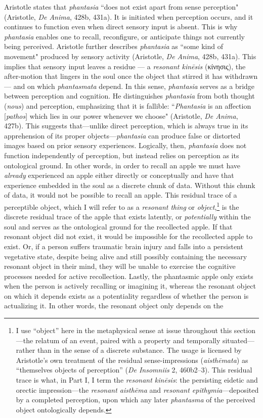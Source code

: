 \documentclass{article}
\newcommand{\gk}[1]{{\greekfont #1}}
\begin{document}
Aristotle states that \textit{phantasia} “does not exist apart from sense perception" (Aristotle, \textit{De Anima}, 428b, 431a). It is initiated when perception occurs, and it continues to function even when direct sensory input is absent. This is why \textit{phantasia} enables one to recall, reconfigure, or anticipate things not currently being perceived. Aristotle further describes \textit{phantasia} as “some kind of movement" produced by sensory activity (Aristotle, \textit{De Anima}, 428b, 431a). This implies that sensory input leaves a residue — a \textit{resonant kinēsis} (\gk{κίνησις}), the after-motion that lingers in the soul once the object that stirred it has withdrawn — and on which \textit{phantasmata} depend. In this sense, \textit{phantasia} serves as a bridge between perception and cognition. He distinguishes \textit{phantasia} from both thought (\textit{nous}) and perception, emphasizing that it is fallible: “\textit{Phantasia} is an affection [\textit{pathos}] which lies in our power whenever we choose" (Aristotle, \textit{De Anima}, 427b). This suggests that—unlike direct perception, which is always true in its apprehension of its proper objects—\textit{phantasia} can produce false or distorted images based on prior sensory experiences. Logically, then, \textit{phantasia} does not function independently of perception, but instead relies on perception as its ontological ground. In other words, in order to recall an apple we must have \textit{already} experienced an apple either directly or conceptually and have that experience embedded in the soul as a discrete chunk of data. Without this chunk of data, it would not be possible to recall an apple. This residual trace of a perceptible object, which I will refer to as a \textit{resonant thing} or \textit{object},\footnote{I use “object” here in the metaphysical sense at issue throughout this section—the relatum of an event, paired with a property and temporally situated—rather than in the sense of a discrete substance. The usage is licensed by Aristotle's own treatment of the residual sense-impressions (\textit{aisthēmata}) as “themselves objects of perception” (\textit{De Insomniis} 2, 460b2–3). This residual trace is what, in Part I, I term the \textit{resonant kinēsis}: the persisting eidetic and orectic impression—the \textit{resonant aisthēma} and \textit{resonant epithymia}—deposited by a completed perception, upon which any later \textit{phantasma} of the perceived object ontologically depends.} is the discrete residual trace of the apple that exists latently, or \textit{potentially} within the soul and serves as the ontological ground for the recollected apple. If that resonant object did not exist, it would be impossible for the recollected apple to exist. Or, if a person suffers traumatic brain injury and falls into a persistent vegetative state, despite being alive and still possibly containing the necessary resonant object in their mind, they will be unable to exercise the cognitive processes needed for active recollection. Lastly, the phantasmic apple only exists when the person is actively recalling or imagining it, whereas the resonant object on which it depends exists as a potentiality regardless of whether the person is actualizing it. In other words, the resonant object only depends on the 
\end{document}
